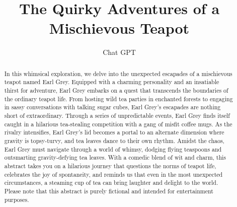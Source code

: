 \documentclass[aps,prl, 9pt,groupedaddress,twocolumn]{revtex4-1}
\begin{document}
\title{The Quirky Adventures of a Mischievous Teapot}

\author{Chat GPT}

\begin{abstract}
	In this whimsical exploration, we delve into the unexpected escapades of a mischievous teapot named Earl Grey. Equipped with a charming personality and an insatiable thirst for adventure, Earl Grey embarks on a quest that transcends the boundaries of the ordinary teapot life. From hosting wild tea parties in enchanted forests to engaging in sassy conversations with talking sugar cubes, Earl Grey's escapades are nothing short of extraordinary.
	Through a series of unpredictable events, Earl Grey finds itself caught in a hilarious tea-stealing competition with a gang of misfit coffee mugs. As the rivalry intensifies, Earl Grey's lid becomes a portal to an alternate dimension where gravity is topsy-turvy, and tea leaves dance to their own rhythm. Amidst the chaos, Earl Grey must navigate through a world of whimsy, dodging flying teaspoons and outsmarting gravity-defying tea leaves.
	With a comedic blend of wit and charm, this abstract takes you on a hilarious journey that questions the norms of teapot life, celebrates the joy of spontaneity, and reminds us that even in the most unexpected circumstances, a steaming cup of tea can bring laughter and delight to the world.
	Please note that this abstract is purely fictional and intended for entertainment purposes.
\end{abstract}

\maketitle








\end{document}
